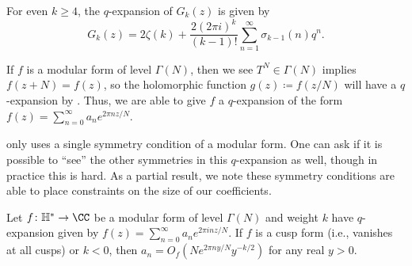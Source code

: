 \documentclass{amsart}
\begin{document}
\begin{example} \label{ex:gk-q-expansion}
	For even $k\ge4$, the $q$-expansion of $G_k(z)$ is given by
	\[G_k(z)=2\zeta(k)+\frac{2(2\pi i)^k}{(k-1)!}\sum_{n=1}^\infty\sigma_{k-1}(n)q^n.\]
\end{example}
\begin{remark}
	If $f$ is a modular form of level $\Gamma(N)$, then we see $T^N\in\Gamma(N)$ implies $f(z+N)=f(z)$, so the holomorphic function $g(z)\coloneqq f(z/N)$ will have a $q$-expansion by . Thus, we are able to give $f$ a $q$-expansion of the form $f(z)=\sum_{n=0}^\infty a_ne^{2\pi nz/N}$.
\end{remark}
 only uses a single symmetry condition of a modular form. One can ask if it is possible to ``see'' the other symmetries in this $q$-expansion as well, though in practice this is hard. As a partial result, we note these symmetry conditions are able to place constraints on the size of our coefficients.
\begin{proposition} \label{prop:coeff-bound}
	Let $f\colon\mathbb H^*\to\CC$ be a modular form of level $\Gamma(N)$ and weight $k$ have $q$-expansion given by $f(z)=\sum_{n=0}^\infty a_ne^{2\pi inz/N}$. If $f$ is a cusp form (i.e., vanishes at all cusps) or $k<0$, then $a_n=O_f\left(Ne^{2\pi ny/N}y^{-k/2}\right)$ for any real $y>0$.
\end{proposition}
\end{document}
